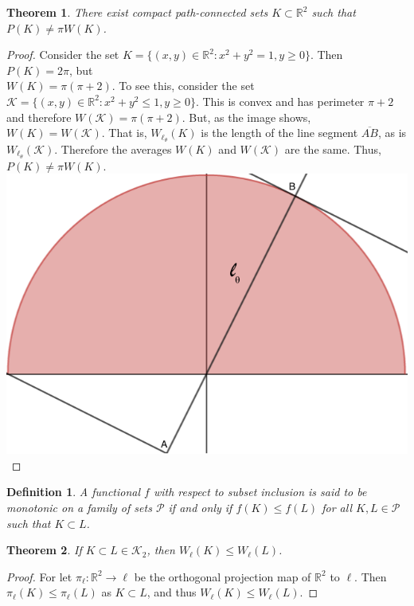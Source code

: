 \documentclass[oneside]{book}
\theoremstyle{mystyle}
\newtheorem{theorem}{Theorem}[section]
\newtheorem{definition}{Definition}[section]
\begin{document}
\begin{theorem}
There exist compact path-connected sets $K\subset \mathbb{R}^2$ such that $P(K) \ne \pi W(K)$.
\end{theorem}
\begin{proof}
Consider the set $K = \{(x,y) \in \mathbb{R}^2: x^2+y^2=1, y\geq 0\}$. Then $P(K) = 2\pi$, but \\ $W(K) = \pi(\pi+2)$. To see this, consider the set $\mathcal{K} = \{(x,y)\in \mathbb{R}^2: x^2 + y^2 \leq 1, y\geq 0\}$. This is convex and has perimeter $\pi+2$ and therefore $W(\mathcal{K}) = \pi(\pi+2)$. But, as the image shows, $W(K) = W(\mathcal{K})$. That is, $W_{\ell_{\theta}}(K)$ is the length of the line segment $\overline{AB}$, as is $W_{\ell_{\theta}}(\mathcal{K})$. Therefore the averages $W(K)$ and $W(\mathcal{K})$ are the same. Thus, $P(K) \ne \pi W(K)$.
\includegraphics[scale=0.3]{semicircle-1.png}
\end{proof}

\begin{definition}
A functional $f$ with respect to subset inclusion is said to be monotonic on a family of sets $\mathscr{P}$ if and only if $f(K)\leq f(L)$ for all $K,L \in \mathscr{P}$ such that $K\subset L$.
\end{definition}

\begin{theorem}
If $K\subset L \in \mathscr{K}_2$, then $W_{\ell}(K) \leq W_{\ell}(L)$.
\end{theorem}
\begin{proof}
For let $\pi_{\ell}:\mathbb{R}^2 \rightarrow \ell$ be the orthogonal projection map of $\mathbb{R}^2$ to $\ell$. Then $\pi_{\ell}(K)\leq \pi_{\ell}(L)$ as $K\subset L$, and thus $W_{\ell}(K)\leq W_{\ell}(L)$.
\end{proof}
\end{document}
